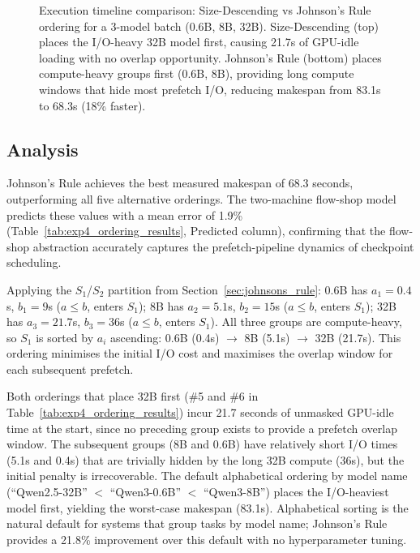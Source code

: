 \documentclass[logo,bsc,singlespacing,parskip,online]{infthesis}
\begin{document}
\begin{figure}[htbp]
\caption{Execution timeline comparison: Size-Descending vs Johnson's Rule ordering for a 3-model batch (0.6B, 8B, 32B). Size-Descending (top) places the I/O-heavy 32B model first, causing 21.7s of GPU-idle loading with no overlap opportunity. Johnson's Rule (bottom) places compute-heavy groups first (0.6B, 8B), providing long compute windows that hide most prefetch I/O, reducing makespan from 83.1s to 68.3s (18\% faster).}
\label{fig:exp4_ordering_gantt}
\end{figure}

\subsection{Analysis}

Johnson's Rule achieves the best measured makespan of 68.3 seconds, outperforming all five alternative orderings. The two-machine flow-shop model predicts these values with a mean error of 1.9\% (Table~\ref{tab:exp4_ordering_results}, Predicted column), confirming that the flow-shop abstraction accurately captures the prefetch-pipeline dynamics of checkpoint scheduling.

Applying the $S_1$/$S_2$ partition from Section~\ref{sec:johnsons_rule}: 0.6B has $a_1=0.4$s, $b_1=9$s ($a \leq b$, enters $S_1$); 8B has $a_2=5.1$s, $b_2=15$s ($a \leq b$, enters $S_1$); 32B has $a_3=21.7$s, $b_3=36$s ($a \leq b$, enters $S_1$). All three groups are compute-heavy, so $S_1$ is sorted by $a_i$ ascending: 0.6B (0.4s) $\to$ 8B (5.1s) $\to$ 32B (21.7s). This ordering minimises the initial I/O cost and maximises the overlap window for each subsequent prefetch.

Both orderings that place 32B first (\#5 and \#6 in Table~\ref{tab:exp4_ordering_results}) incur 21.7 seconds of unmasked GPU-idle time at the start, since no preceding group exists to provide a prefetch overlap window. The subsequent groups (8B and 0.6B) have relatively short I/O times (5.1s and 0.4s) that are trivially hidden by the long 32B compute (36s), but the initial penalty is irrecoverable. The default alphabetical ordering by model name (``Qwen2.5-32B'' $<$ ``Qwen3-0.6B'' $<$ ``Qwen3-8B'') places the I/O-heaviest model first, yielding the worst-case makespan (83.1s). Alphabetical sorting is the natural default for systems that group tasks by model name; Johnson's Rule provides a 21.8\% improvement over this default with no hyperparameter tuning.
\end{document}
